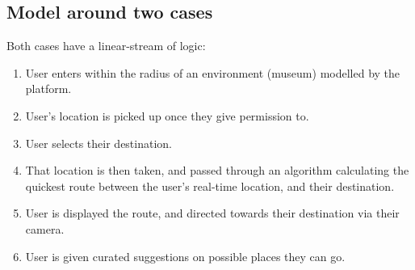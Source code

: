 \subsection*{Model around two cases}
Both cases have a linear-stream of logic:

\begin{enumerate}
    \item User enters within the radius of an environment (museum) modelled by the platform.
    \item User’s location is picked up once they give permission to.
    \item User selects their destination.
    \item That location is then taken, and passed through an algorithm calculating the quickest route between the user’s real-time location, and their destination.
    \item User is displayed the route, and directed towards their destination via their camera.
    \item User is given curated suggestions on possible places they can go.
\end{enumerate}